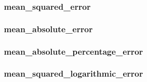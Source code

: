 \subsubsection{mean\_squared\_error}\label{meanux5fsquaredux5ferror}

\begin{Shaded}
\begin{Highlighting}[]
\end{Highlighting}
\end{Shaded}



\subsubsection{mean\_absolute\_error}\label{meanux5fabsoluteux5ferror}

\begin{Shaded}
\begin{Highlighting}[]
\end{Highlighting}
\end{Shaded}



\subsubsection{mean\_absolute\_percentage\_error}\label{meanux5fabsoluteux5fpercentageux5ferror}

\begin{Shaded}
\begin{Highlighting}[]
\end{Highlighting}
\end{Shaded}



\subsubsection{mean\_squared\_logarithmic\_error}\label{meanux5fsquaredux5flogarithmicux5ferror}

\begin{Shaded}
\begin{Highlighting}[]
\end{Highlighting}
\end{Shaded}



